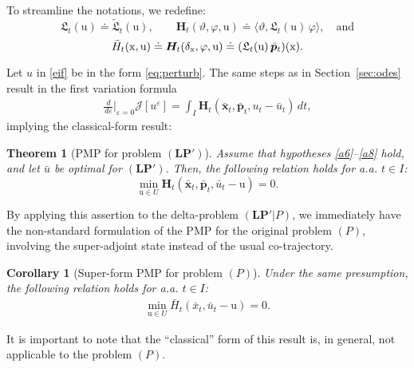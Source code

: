 \documentclass[sn-mathphys-num]{sn-jnl}
\numberwithin{equation}{section}
\theoremstyle{mythm}
\newtheorem{theorem}[proposition]{Theorem}
\newtheorem{corollary}[proposition]{Corollary}
\theoremstyle{mydef}
\renewcommand{\epsilon}{\varepsilon}
\renewcommand{\phi}{\varphi}
\renewcommand{\d}{\,d}
\begin{document}
To streamline the notations, we redefine:  
\[
  \mathfrak{L}_t(\mathrm{u}) \doteq \widetilde{\mathfrak{L}}_t(\mathrm{u}), \qquad \bm H_t(\vartheta,\phi, \mathrm  u) \doteq \langle \vartheta, \mathfrak L_t(\mathrm{u})\, \phi\rangle,  \quad \mbox{and}
\]
\[
  \bar H_t(\mathrm{x}, {\mathrm  u}) \doteq \bm H_t(\delta_{\rm x},\phi, \mathrm  u)\doteq (\mathfrak L_t(\mathrm u)\,\bar{\bm p}_t)(\rm x).
\]

Let $u$ in \eqref{eif} be in the form \eqref{eq:perturb}. The same steps as in Section~\ref{sec:odes} result in the first variation formula
\begin{align}
    \frac{\d}{\d \varepsilon}\big|_{\varepsilon =0}\mathcal J[u^\epsilon] =  
    \int_I \bm H_t(\bar{{\bm x}}_t,  \bar{\bm p}_t, u_t-\bar u_t) \d t,\label{fvf}
\end{align}
implying the classical-form result: 
\begin{theorem}[PMP for problem $(\bm{LP}')$]\label{PMP1}
    Assume that hypotheses \ref{a6}--\ref{a8} hold, and let $\bar u$ be optimal for $(\bm{LP}')$. Then, the following relation holds for a.a. $t\in I$: 
\begin{equation}\label{PMP}
  \min_{\mathrm u \in U}\bm H_t(\bar{{\bm x}}_t,  \bar{\bm p}_t, \bar u_t-\mathrm u) = 0.
\end{equation}
\end{theorem}
By applying this assertion to the delta-problem $(\bm{LP}'|P)$, we immediately have the non-standard formulation of the PMP   
for the original problem $(P)$, involving the super-adjoint state instead of the usual co-trajectory.
 \begin{corollary}[Super-form PMP for problem $(P)$]\label{PMP2} 
Under the same presumption, the following relation holds for a.a. $t \in I$: 
\begin{align}
    \min_{\mathrm u \in U}\bar H_t(\bar x_t, \bar u_t -{\mathrm u})=0.
    \label{pmp_sf}
\end{align}
\end{corollary}
It is important to note that the ``classical'' form of this result is, in general, not applicable to the problem \((P)\).
\end{document}
